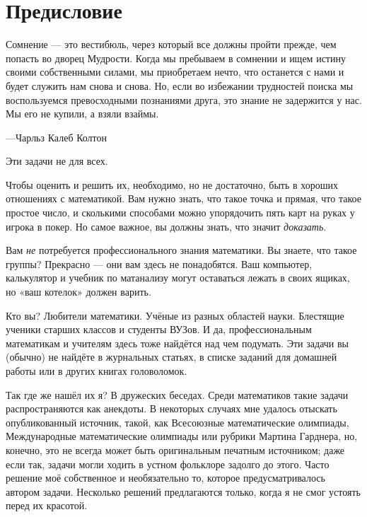 \chapter*{Предисловие}

\setlength{\epigraphwidth}{.8\textwidth}
\epigraph{Сомнение --- это вестибюль, через который все должны пройти прежде, чем попасть во дворец Мудрости.
Когда мы пребываем в сомнении и ищем истину своими собственными силами, мы приобретаем нечто, что останется с нами и будет служить нам снова и снова.
Но, если во избежании трудностей поиска мы воспользуемся превосходными познаниями друга, это знание не задержится у нас.
Мы его не купили, а взяли взаймы.}{---Чарльз Калеб Колтон}
                                                                                     

Эти задачи не для всех.

Чтобы оценить и решить их, необходимо, но не достаточно, быть в хороших отношениях с математикой.
Вам нужно знать, что такое точка и прямая, что такое простое число, и сколькими способами можно упорядочить пять карт на руках у игрока в покер.
Но самое важное, вы должны знать, что значит \emph{доказать}.

Вам \emph{не} потребуется профессионального знания математики.
Вы знаете, что такое группы? Прекрасно ---  они вам здесь не понадобятся.
Ваш компьютер, калькулятор и учебник по матанализу могут оставаться лежать в своих ящиках, но «ваш котелок» должен варить.

Кто вы? Любители математики.
Учёные из разных областей науки.
Блестящие ученики старших классов и студенты ВУЗов.
И да, профессиональным математикам и учителям здесь тоже найдётся над чем подумать.
Эти задачи вы (обычно) не найдёте в журнальных статьях, в списке заданий для домашней работы или в других книгах головоломок.

Так где же нашёл их я? В дружеских беседах.
Среди математиков такие задачи распространяются как анекдоты.
В некоторых случаях мне удалось отыскать опубликованный источник, такой, как Всесоюзные математические олимпиады, Международные математические олимпиады или рубрики Мартина Гарднера, но, конечно, это не всегда может быть оригинальным печатным источником;
даже если так, задачи могли ходить в устном фольклоре задолго до этого.
Часто решение моё собственное и необязательно то, которое предусматривалось автором задачи.
Несколько решений предлагаются только, когда я не смог устоять перед их красотой.

